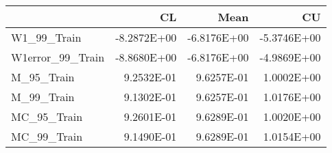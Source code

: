 \begin{tabular}{lrrr}
\toprule
{} &          CL &        Mean &          CU \\
\midrule
W1\_99\_Train      & -8.2872E+00 & -6.8176E+00 & -5.3746E+00 \\
W1error\_99\_Train & -8.8680E+00 & -6.8176E+00 & -4.9869E+00 \\
M\_95\_Train       &  9.2532E-01 &  9.6257E-01 &  1.0002E+00 \\
M\_99\_Train       &  9.1302E-01 &  9.6257E-01 &  1.0176E+00 \\
MC\_95\_Train      &  9.2601E-01 &  9.6289E-01 &  1.0020E+00 \\
MC\_99\_Train      &  9.1490E-01 &  9.6289E-01 &  1.0154E+00 \\
\bottomrule
\end{tabular}
